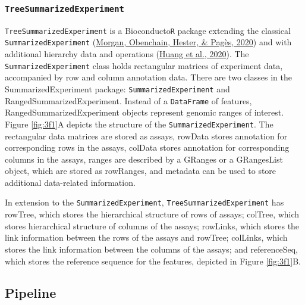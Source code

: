 \documentclass[12pt,twoside]{reedthesis}
\begin{document}
\hypertarget{treesummarizedexperiment}{%
\subsubsection{\texorpdfstring{\texttt{TreeSummarizedExperiment}}{TreeSummarizedExperiment}}\label{treesummarizedexperiment}}

\texttt{TreeSummarizedExperiment} is a Bioconducto\texttt{R} package extending the
classical \texttt{SummarizedExperiment} (\protect\hyperlink{ref-morgan2020}{Morgan, Obenchain, Hester, \& Pagès, 2020}) and with additional
hierarchy data and operations (\protect\hyperlink{ref-huang2020}{Huang et al., 2020}). The \texttt{SummarizedExperiment}
class holds rectangular matrices of experiment data, accompanied by row
and column annotation data. There are two classes in the
SummarizedExperiment package: \texttt{SummarizedExperiment} and
RangedSummarizedExperiment. Instead of a \texttt{DataFrame} of features,
RangedSummarizedExperiment objects represent genomic ranges of interest.
Figure \ref{fig:3f1}A depicts the structure of the \texttt{SummarizedExperiment}. The
rectangular data matrices are stored as assays, rowData stores
annotation for corresponding rows in the assays, colData stores
annotation for corresponding columns in the assays, ranges are described
by a GRanges or a GRangesList object, which are stored as rowRanges, and
metadata can be used to store additional data-related information.

In extension to the \texttt{SummarizedExperiment}, \texttt{TreeSummarizedExperiment} has
rowTree, which stores the hierarchical structure of rows of assays;
colTree, which stores hierarchical structure of columns of the assays;
rowLinks, which stores the link information between the rows of the
assays and rowTree; colLinks, which stores the link information between
the columns of the assays; and referenceSeq, which stores the reference
sequence for the features, depicted in Figure \ref{fig:3f1}B.



\hypertarget{pipeline}{%
\subsection{Pipeline}\label{pipeline}}
\end{document}
